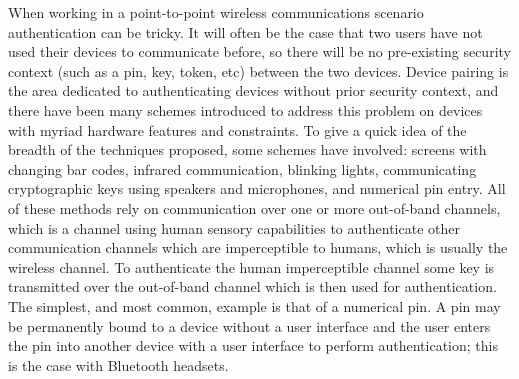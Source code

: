 \documentclass[12pt,dvips]{report}
\begin{document}
When working in a point-to-point wireless communications scenario authentication can be tricky. It will often be the case that two users have not used their devices to communicate before, so there will be no pre-existing security context (such as a pin, key, token, etc) between the two devices. 
Device pairing is the area dedicated to authenticating devices without prior security context, and there have been many schemes introduced to address this problem on devices with myriad hardware features and constraints. To give a quick idea of the breadth of the techniques proposed, some schemes have involved: screens with changing bar codes, infrared communication, blinking lights, communicating cryptographic keys using speakers and microphones, and numerical pin entry. All of these methods rely on communication over one or more out-of-band channels, which is a channel using human sensory capabilities to authenticate other communication channels which are imperceptible to humans, which is usually the wireless channel. To authenticate the human imperceptible channel some key is transmitted over the out-of-band channel which is then used for authentication. The simplest, and most common, example is that of a numerical pin. A pin may be permanently bound to a device without a user interface and the user enters the pin into another device with a user interface to perform authentication; this is the case with Bluetooth headsets.
\end{document}
